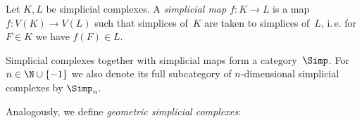 \begin{thDef}
    Let $K,L$ be simplicial complexes. A \emph{simplicial map $f\colon K\to L$}
    is a map $f\colon V(K)\to V(L)$ such that simplices of~$K$ are taken to
    simplices of~$L$, i.\,e. for $F\in K$ we have $f(F) \in L$.
\end{thDef}

\begin{thDef}
    Simplicial complexes together with simplicial maps form a category~$\Simp$.
    For $n\in\N\cup\{-1\}$ we also denote its full subcategory of
    $n$-dimensional simplicial complexes by $\Simp_n$.
\end{thDef}

Analogously, we define \emph{geometric simplicial complexes}:

